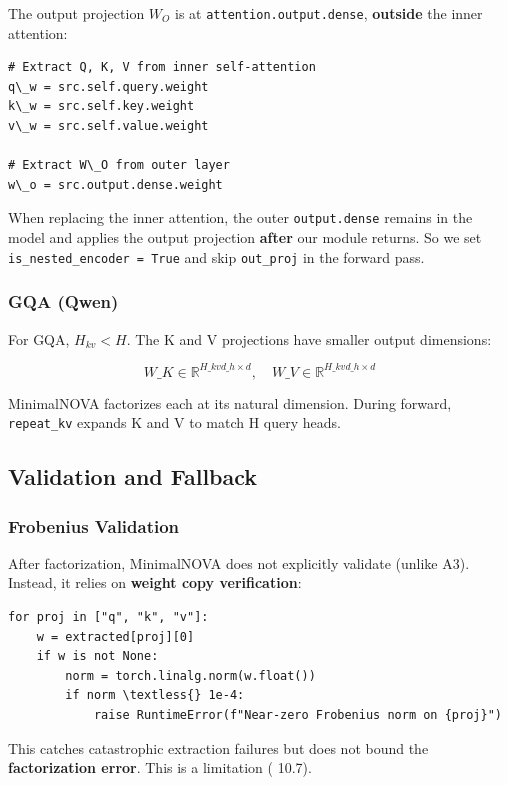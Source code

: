 The output projection $W_O$ is at \texttt{attention.output.dense}, \textbf{outside} the 
inner attention:

\begin{lstlisting}
# Extract Q, K, V from inner self-attention
q\_w = src.self.query.weight
k\_w = src.self.key.weight
v\_w = src.self.value.weight

# Extract W\_O from outer layer
w\_o = src.output.dense.weight
\end{lstlisting}

When replacing the inner attention, the outer \texttt{output.dense} remains in 
the model and applies the output projection \textbf{after} our module returns. 
So we set \texttt{is\_nested\_encoder = True} and skip \texttt{out\_proj} in the forward 
pass.

\subsubsection{GQA (Qwen)}

For GQA, $H_{kv} < H$. The K and V projections have smaller output 
dimensions:

\[
W\_K \in \mathbb{R}^{H\_{kv} d\_h \times d}, \quad
W\_V \in \mathbb{R}^{H\_{kv} d\_h \times d}
\tag{4.7}
\]

MinimalNOVA factorizes each at its natural dimension. During forward, 
\texttt{repeat\_kv} expands K and V to match H query heads.

\subsection{Validation and Fallback}

\subsubsection{Frobenius Validation}

After factorization, MinimalNOVA does not explicitly validate (unlike A3). 
Instead, it relies on \textbf{weight copy verification}:

\begin{lstlisting}
for proj in ["q", "k", "v"]:
    w = extracted[proj][0]
    if w is not None:
        norm = torch.linalg.norm(w.float())
        if norm \textless{} 1e-4:
            raise RuntimeError(f"Near-zero Frobenius norm on {proj}")
\end{lstlisting}

This catches catastrophic extraction failures but does not bound the 
\textbf{factorization error}. This is a limitation ( 10.7).

